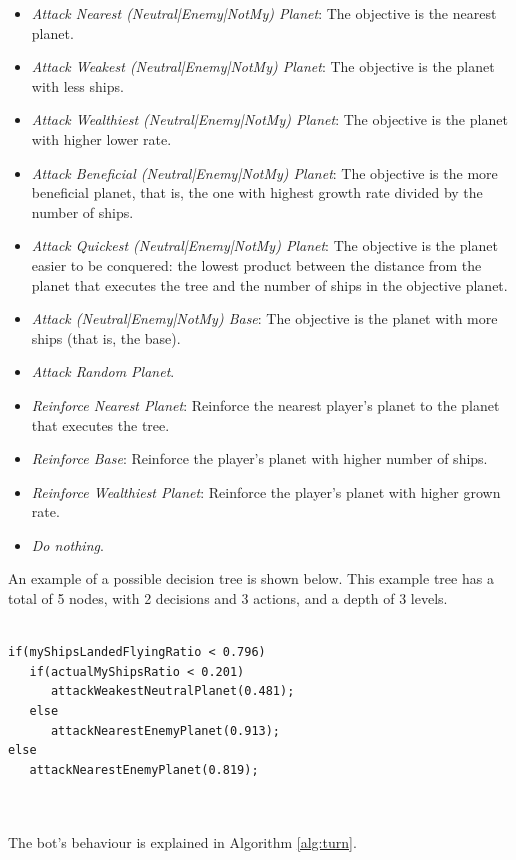 \documentclass[preprint]{elsarticle}
\begin{document}
\begin{itemize}
\item {\em Attack Nearest (Neutral|Enemy|NotMy) Planet}: The objective is the nearest planet.
\item {\em Attack Weakest (Neutral|Enemy|NotMy) Planet}: The objective is the planet with less ships.
\item {\em Attack Wealthiest (Neutral|Enemy|NotMy) Planet}: The objective is the planet with higher lower rate.
\item {\em Attack Beneficial (Neutral|Enemy|NotMy) Planet}: The objective is the  more beneficial planet, that is, the one with highest growth rate divided by the number of ships.
\item {\em Attack Quickest (Neutral|Enemy|NotMy) Planet}: The objective is the planet easier to be conquered: the lowest product between the distance from the planet that executes the tree and the number of  ships in the objective planet.
\item {\em Attack (Neutral|Enemy|NotMy) Base}: The objective is the planet with more ships (that is, the base).
\item {\em  Attack Random Planet}.
\item {\em Reinforce Nearest Planet}: Reinforce the nearest player's planet to the planet that executes the tree.
\item {\em Reinforce Base}: Reinforce the player's planet with higher number of ships.
\item {\em Reinforce Wealthiest Planet}: Reinforce the player's planet with higher grown rate.
\item {\em Do nothing}.

\end{itemize}

\noindent An example of a possible decision tree is shown below. This example tree has a total of 5 nodes, with 2 decisions and 3 actions, and a depth of 3 levels.

\begin{verbatim}

if(myShipsLandedFlyingRatio < 0.796)
   if(actualMyShipsRatio < 0.201)
      attackWeakestNeutralPlanet(0.481);
   else
      attackNearestEnemyPlanet(0.913);
else
   attackNearestEnemyPlanet(0.819);

\end{verbatim}\\\\

\noindent The bot's behaviour is explained in Algorithm \ref{alg:turn}.
\end{document}
